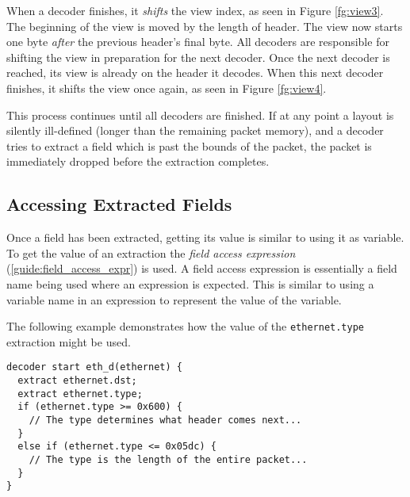 
When a decoder finishes, it \textit{shifts} the view index, as seen in Figure
\ref{fg:view3}. The beginning of the view is moved by the length of header.
The view now starts one byte \textit{after} the previous header's final byte. 
All decoders are responsible for shifting the view in
preparation for the next decoder. Once the next decoder is reached, its view is
already on the header it decodes. When this next decoder finishes, it shifts the
view once again, as seen in Figure \ref{fg:view4}.

This process continues until all decoders are finished.
If at any point a layout is silently ill-defined 
(longer than the remaining packet memory), and a decoder tries
to extract a field which is past the bounds of the packet, the packet
is immediately dropped before the extraction completes.

\subsection{Accessing Extracted Fields} \label{tut:decoder_access}


Once a field has been extracted, getting its value is similar to using
it as variable.
To get the value of an extraction
the \textit{field access expression} (\ref{guide:field_access_expr}) is used.
A field access expression is essentially a field name being used where
an expression is expected. This is similar to using a variable name
in an expression to represent the value of the variable.

The following example demonstrates how the value of the \texttt{ethernet.type} 
extraction might be used.

\begin{codepage}
\begin{lstlisting}
decoder start eth_d(ethernet) {
  extract ethernet.dst;
  extract ethernet.type;
  if (ethernet.type >= 0x600) {
    // The type determines what header comes next...
  }
  else if (ethernet.type <= 0x05dc) {
    // The type is the length of the entire packet...
  }
}
\end{lstlisting}
\end{codepage}

